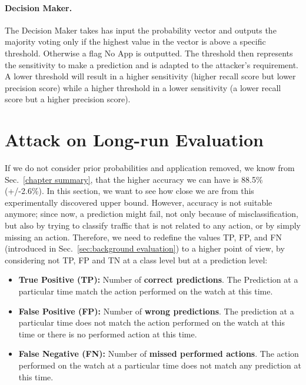 \paragraph{Decision Maker.} The Decision Maker takes has input the probability vector and outputs the majority voting only if the highest value in the vector is above a specific threshold. Otherwise a flag No App is outputted. The threshold then represents the sensitivity to make a prediction and is adapted to the attacker's requirement. A lower threshold will result in a  higher sensitivity (higher recall score but lower precision score) while a higher threshold in a lower sensitivity (a lower recall score but a higher precision score).





\newpage


\section{Attack on Long-run Evaluation}
If we do not consider prior probabilities and application removed, we know from Sec.~\ref{chapter summary}, that the higher accuracy we can have is 88.5\% (+/-2.6\%). In this section, we want to see how close we are from this experimentally discovered upper bound. However, accuracy is not suitable anymore; since now, a prediction might fail, not only because of misclassification, but also by trying to classify traffic that is not related to any action, or by simply missing an action. Therefore, we need to redefine the values TP, FP, and FN (introduced in Sec.~\ref{sec:background evaluation}) to a higher point of view, by considering not TP, FP and TN at a class level but at a prediction level:

\begin{itemize}
    \item \textbf{True Positive (TP):} Number of \textbf{correct predictions}. The Prediction at a particular time match the action performed on the watch at this time.

    \item \textbf{False Positive (FP):} Number of \textbf{wrong predictions}. The prediction at a particular time does not match the action performed on the watch at this time or there is no performed action at this time.

    \item \textbf{False Negative (FN):} Number of \textbf{missed performed actions}. The action performed on the watch at a particular time does not match any prediction at this time. 
\end{itemize}


